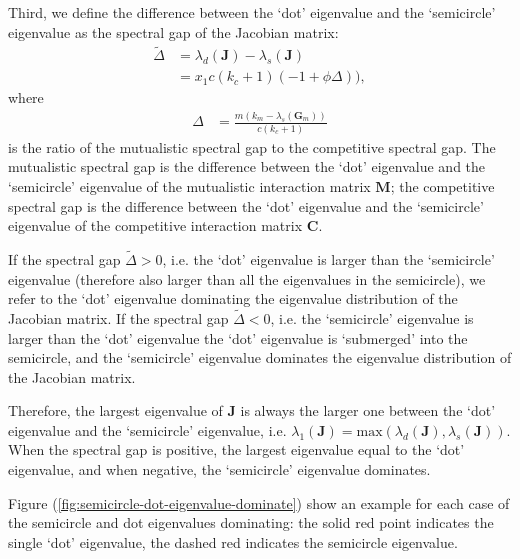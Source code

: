 \documentclass[a4paper,fleqn,12pt]{article}
\begin{document}
Third, we define the difference between the `dot' eigenvalue and the `semicircle' eigenvalue as the spectral gap of the Jacobian matrix:
\begin{align} \label{eq:nonstructural-gap-definition}
\widetilde{\Delta} &= \lambda_d(\mathbf{J}) - \lambda_s(\mathbf{J}) \nonumber \\
 &= x_1c(k_c+1)(-1 + \phi \Delta)),
\end{align}
where
\begin{align}
\Delta 
&= \frac{m(k_m - \lambda_s(\mathbf{G}_m))}{c(k_c + 1)} \nonumber
\end{align}
is the ratio of the mutualistic spectral gap to the competitive spectral gap.
The mutualistic spectral gap is the difference between the `dot' eigenvalue and the `semicircle' eigenvalue of the mutualistic interaction matrix $\mathbf{M}$;
the competitive spectral gap is the difference between the `dot' eigenvalue and the `semicircle' eigenvalue of the competitive interaction matrix $\mathbf{C}$.

If the spectral gap $\widetilde{\Delta} > 0$, i.e. the `dot' eigenvalue is larger than the `semicircle' eigenvalue (therefore also larger than all the eigenvalues in the semicircle), we refer to the `dot' eigenvalue dominating the eigenvalue distribution of the Jacobian matrix.
If the spectral gap $\widetilde{\Delta} < 0$, i.e. the `semicircle' eigenvalue is larger than the `dot' eigenvalue the `dot' eigenvalue is `submerged' into the semicircle,
and the `semicircle' eigenvalue dominates the eigenvalue distribution of the Jacobian matrix.

Therefore, the largest eigenvalue of $\mathbf{J}$ is always the larger one between the `dot' eigenvalue and the `semicircle' eigenvalue, i.e. $\lambda_1(\mathbf{J}) = \mathrm{max}(\lambda_d(\mathbf{J}), \lambda_s(\mathbf{J}))$. 
When the spectral gap is positive, the largest eigenvalue equal to the `dot' eigenvalue, and when negative, the `semicircle' eigenvalue dominates.

Figure (\ref{fig:semicircle-dot-eigenvalue-dominate}) show an example for each case of the  semicircle and dot eigenvalues dominating: the solid red point indicates the single `dot' eigenvalue, the dashed red indicates the semicircle eigenvalue.
\end{document}

